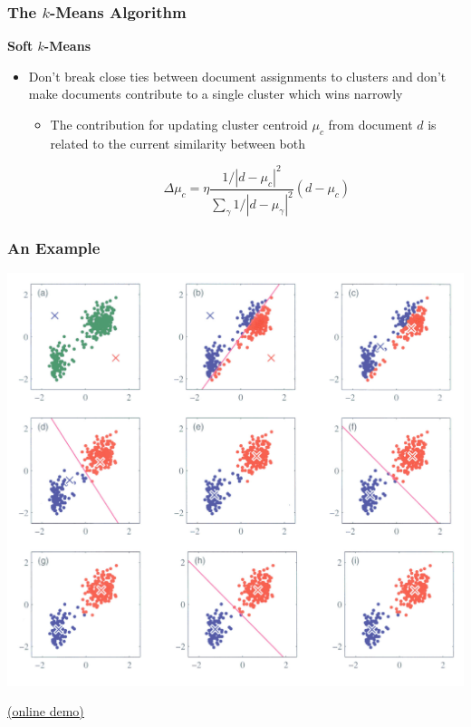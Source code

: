 \documentclass{beamer}
\begin{document}

\begin{frame}
  \frametitle{The $k$-Means Algorithm}

  \textbf{Soft $k$-Means}
  \begin{itemize}
  \item Don't break close ties between document assignments to clusters and
    don't make documents contribute to a single cluster which wins narrowly
    \begin{itemize}
    \item The contribution for updating cluster centroid $\mu_c$ from document
      $d$ is related to the current similarity between both
      \begin{block}{}
        \begin{displaymath}
          \Delta\mu_c = \eta\frac{1/|d-\mu_c|^2}{\sum_\gamma
            1/|d-\mu_\gamma|^2}(d - \mu_c)
        \end{displaymath}
      \end{block}
    \end{itemize}
  \end{itemize}

\end{frame}


\begin{frame}
  \frametitle{An Example}
  
  \centering
  \href{http://www.cse.psu.edu/~rcollins/CSE586Spring2010/papers/prmlMixturesEM.pdf}{\includegraphics[height=.9\textheight]{k-means}}

  \raggedleft
  \tiny
  \href{http://mlehman.github.io/kmeans-javascript/}{(online demo)}
\end{frame}
\end{document}
